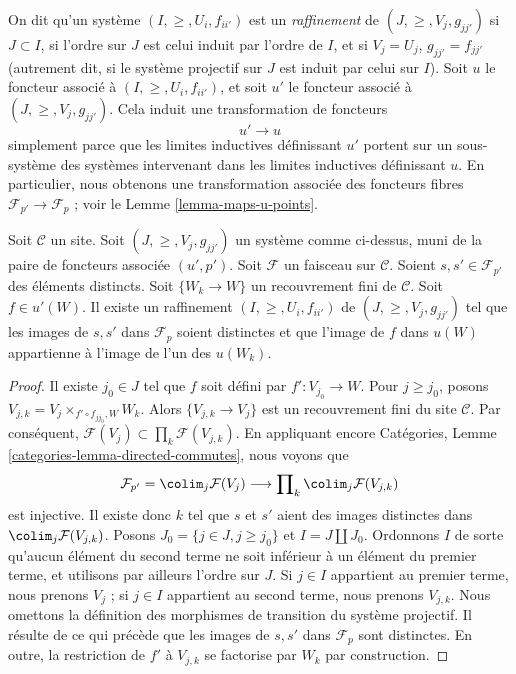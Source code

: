 \medskip\noindent
On dit qu’un système $(I, \geq, U_i, f_{ii'})$
est un {\it raffinement} de $(J, \geq, V_j, g_{jj'})$ si
$J \subset I$, si l’ordre sur $J$ est celui induit par l’ordre de $I$,
et si $V_j = U_j$, $g_{jj'} = f_{jj'}$ (autrement dit, si le système projectif
sur $J$ est induit par celui sur $I$). Soit $u$ le foncteur
associé à $(I, \geq, U_i, f_{ii'})$, et soit $u'$ le
foncteur associé à $(J, \geq, V_j, g_{jj'})$.
Cela induit une transformation de foncteurs
$$
u' \longrightarrow u
$$
simplement parce que les limites inductives définissant $u'$ portent sur un sous-système
des systèmes intervenant dans les limites inductives définissant $u$.
En particulier, nous obtenons une transformation associée des
foncteurs fibres $\mathcal{F}_{p'} \to \mathcal{F}_p$ ;
voir le Lemme \ref{lemma-maps-u-points}.

\begin{lemma}
\label{lemma-refine}
Soit $\mathcal{C}$ un site.
Soit $(J, \geq, V_j, g_{jj'})$ un système comme ci-dessus, muni de la
paire de foncteurs associée $(u', p')$.
Soit $\mathcal{F}$ un faisceau sur $\mathcal{C}$.
Soient $s, s' \in \mathcal{F}_{p'}$ des éléments distincts.
Soit $\{W_k \to W\}$ un recouvrement fini de $\mathcal{C}$.
Soit $f \in u'(W)$.
Il existe un raffinement $(I, \geq, U_i, f_{ii'})$
de $(J, \geq, V_j, g_{jj'})$ tel que les images de $s, s'$ dans
$\mathcal{F}_p$ soient distinctes et que
l’image de $f$ dans $u(W)$ appartienne à l’image de l’un des
$u(W_k)$.
\end{lemma}

\begin{proof}
Il existe $j_0 \in J$ tel que $f$ soit défini par $f' : V_{j_0} \to W$.
Pour $j \geq j_0$, posons $V_{j, k} = V_j \times_{f'\circ f_{j j_0}, W} W_k$.
Alors $\{V_{j, k} \to V_j\}$ est un recouvrement fini du site
$\mathcal{C}$. Par conséquent,
$\mathcal{F}(V_j) \subset \prod_k \mathcal{F}(V_{j, k})$.
En appliquant encore Catégories, Lemme \ref{categories-lemma-directed-commutes},
nous voyons que
$$
\mathcal{F}_{p'} =
\colim_j \mathcal{F}(V_j)
\longrightarrow
\prod\nolimits_k \colim_j \mathcal{F}(V_{j, k})
$$
est injective. Il existe donc $k$ tel que $s$ et $s'$ aient des images
distinctes dans $\colim_j \mathcal{F}(V_{j, k})$.
Posons $J_0 = \{j \in J, j \geq j_0\}$ et $I = J \amalg J_0$.
Ordonnons $I$ de sorte qu’aucun élément du second terme
ne soit inférieur à un élément du premier terme, et utilisons par ailleurs
l’ordre sur $J$. Si $j \in I$ appartient au premier
terme, nous prenons $V_j$ ; si $j \in I$ appartient au second terme,
nous prenons $V_{j, k}$. Nous omettons la définition
des morphismes de transition du système projectif. Il résulte de ce qui précède
que les images de $s, s'$ dans $\mathcal{F}_p$ sont distinctes.
En outre, la restriction de $f'$ à $V_{j, k}$ se factorise
par $W_k$ par construction.
\end{proof}

